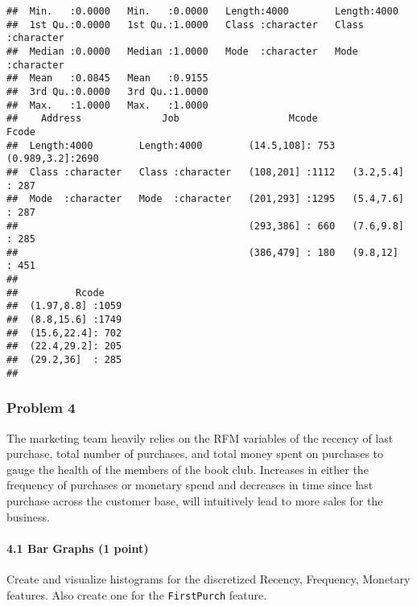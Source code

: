 \documentclass[
]{article}
\newenvironment{Shaded}{\begin{snugshade}}{\end{snugshade}}
\newcommand{\FunctionTok}[1]{\textcolor[rgb]{0.00,0.00,0.00}{#1}}
\newcommand{\NormalTok}[1]{#1}
\newcommand{\SpecialCharTok}[1]{\textcolor[rgb]{0.00,0.00,0.00}{#1}}
\begin{document}
\begin{verbatim}
##  Min.   :0.0000   Min.   :0.0000   Length:4000        Length:4000       
##  1st Qu.:0.0000   1st Qu.:1.0000   Class :character   Class :character  
##  Median :0.0000   Median :1.0000   Mode  :character   Mode  :character  
##  Mean   :0.0845   Mean   :0.9155                                        
##  3rd Qu.:0.0000   3rd Qu.:1.0000                                        
##  Max.   :1.0000   Max.   :1.0000                                        
##    Address              Job                   Mcode              Fcode     
##  Length:4000        Length:4000        (14.5,108]: 753   (0.989,3.2]:2690  
##  Class :character   Class :character   (108,201] :1112   (3.2,5.4]  : 287  
##  Mode  :character   Mode  :character   (201,293] :1295   (5.4,7.6]  : 287  
##                                        (293,386] : 660   (7.6,9.8]  : 285  
##                                        (386,479] : 180   (9.8,12]   : 451  
##                                                                            
##          Rcode     
##  (1.97,8.8] :1059  
##  (8.8,15.6] :1749  
##  (15.6,22.4]: 702  
##  (22.4,29.2]: 205  
##  (29.2,36]  : 285  
## 
\end{verbatim}

\hypertarget{problem-4}{%
\subsubsection{Problem 4}\label{problem-4}}

The marketing team heavily relies on the RFM variables of the recency of
last purchase, total number of purchases, and total money spent on
purchases to gauge the health of the members of the book club. Increases
in either the frequency of purchases or monetary spend and decreases in
time since last purchase across the customer base, will intuitively lead
to more sales for the business.

\hypertarget{bar-graphs-1-point}{%
\paragraph{4.1 Bar Graphs (1 point)}\label{bar-graphs-1-point}}

Create and visualize histograms for the discretized Recency, Frequency,
Monetary features. Also create one for the \texttt{FirstPurch} feature.

\begin{Shaded}
\end{Shaded}
\end{document}
